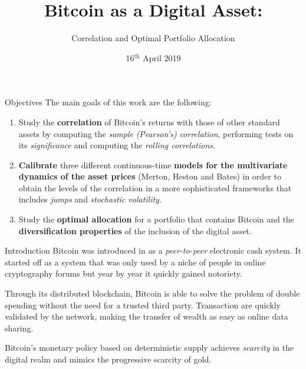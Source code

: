 \documentclass[c, 10pt]{beamer}
\title{Bitcoin as a Digital Asset:}
\subtitle{Correlation and Optimal Portfolio Allocation}
\author[Samuele Vianello]{%
	\usebox{\authbox}
}
\institute{School of Industrial and Information Engineering \\
	Master of Science in Mathematical Engineering}
\date{16$^{\text{th}}$ April 2019}
\begin{document}

    \begin{frame}
    	\bigskip
    	
    	\bigskip
    	
    	\bigskip
    	\large
        \maketitle
    \end{frame}
	
	\begin{frame}{Objectives}
	The main goals of this work are the following:
		\begin{enumerate}
			\item Study the \textbf{correlation} of Bitcoin's returns with those of other standard assets by computing the \textit{sample} \textit{(Pearson's)} \textit{correlation}, performing tests on its \textit{significance} and computing the \textit{rolling correlations}.
			\item \textbf{Calibrate} three different continuous-time \textbf{models for the multivariate dynamics of the asset prices} (Merton, Heston and Bates) in order to obtain the levels of the correlation in a more sophisticated frameworks that includes \textit{jumps} and \textit{stochastic volatility}.
			\item Study the \textbf{optimal allocation} for a portfolio that contains Bitcoin and the \textbf{diversification properties} of the inclusion of the digital asset. 
		\end{enumerate}
	\end{frame}


\begin{frame}{Introduction}
Bitcoin was introduced in \citep{BTC2008} as a \textit{peer-to-peer} electronic cash system. It started off as a system that was only used by a niche of people in online cryptography forums but year by year it quickly gained notoriety.

\bigskip
Through its distributed blockchain, Bitcoin is able to solve the problem of double spending without the need for a trusted third party. Transaction are quickly validated by the network, making the transfer of wealth as easy as online data sharing.

\bigskip
Bitcoin's monetary policy based on deterministic supply achieves \textit{scarcity} in the digital realm and mimics the progressive scarcity of gold.
\end{frame}
\end{document}
